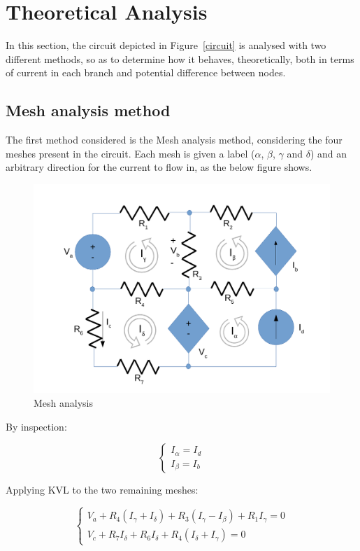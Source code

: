 \section{Theoretical Analysis}
\label{sec:analysis}

In this section, the circuit depicted in Figure~\ref{circuit} is analysed with two different methods, so as to determine how it behaves, theoretically, both in terms of current in each branch and potential difference between nodes.

\subsection{Mesh analysis method}

The first method considered is the Mesh analysis method, considering the four meshes present in the circuit. Each mesh is given a label ($\alpha$, $\beta$, $\gamma$ and $\delta$) and an arbitrary direction for the current to flow in, as the below figure shows.

\begin{figure}[H]
  \centering
  \includegraphics[width=0.8\linewidth]{mesh.pdf}
  \caption{Mesh analysis}
  \label{mesh_fig}
\end{figure}

By inspection:

\begin{equation}
  \begin{cases}
    I_{\alpha} = I_d \\
    I_{\beta} = I_b
  \end{cases}
\end{equation}

Applying KVL to the two remaining meshes:

\begin{equation}
  \begin{cases}
    V_a + R_4 (I_\gamma + I_\delta) + R_3 (I_\gamma - I_\beta) + R_1 I_\gamma = 0 \\
    V_c + R_7 I_\delta + R_6 I_\delta + R_4 (I_\delta + I_\gamma) = 0
  \end{cases}
\end{equation}

